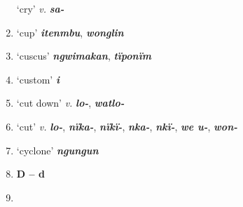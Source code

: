 \begin{enumerate}[noitemsep, label={}, align=left, widest=190, labelsep=1ex,leftmargin=*,itemindent=-10pt]
‘cry’ \textit{v.} \textbf{\textit{sa-}} \item
‘cup’ \textbf{\textit{itenmbu}}, \textbf{\textit{wonglin}} \item
‘cuscus’ \textbf{\textit{ngwimakan}}, \textbf{\textit{tïponïm}} \item
‘custom’ \textbf{\textit{i}} \item
‘cut down’ \textit{v.} \textbf{\textit{lo-}}, \textbf{\textit{watlo-}} \item
‘cut’ \textit{v.} \textbf{\textit{lo-}}, \textbf{\textit{nïka-}}, \textbf{\textit{nïkï-}}, \textbf{\textit{nka-}}, \textbf{\textit{nkï-}}, \textbf{\textit{we u-}}, \textbf{\textit{won-}} \item
‘cyclone’ \textbf{\textit{ngungun}}\\ \item

\noindent \textbf{D – d}\\ \item


\end{enumerate}
